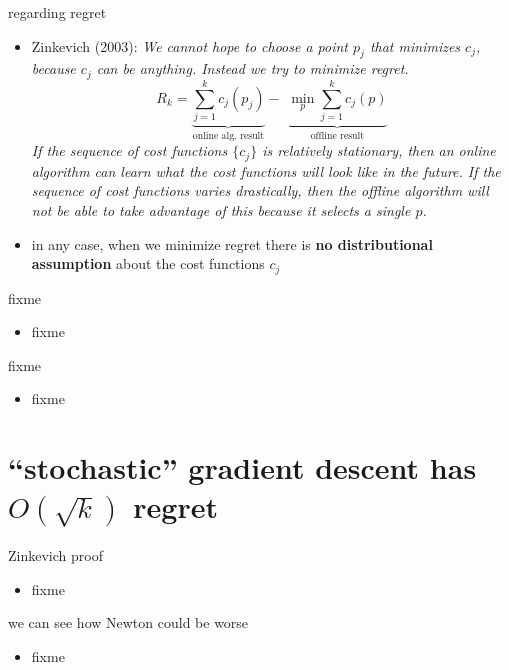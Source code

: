 \documentclass[xcolor={svgnames},
               hyperref={colorlinks,citecolor=DeepPink4,linkcolor=FireBrick,urlcolor=Maroon}]
               {beamer}
\begin{document}
\begin{frame}{regarding regret}

\begin{itemize}
\item Zinkevich (2003): \emph{We cannot hope to choose a point $p_j$ that minimizes $c_j$, because $c_j$ can be anything. Instead we try to minimize regret.}
  $$R_k = \underbrace{\sum_{j=1}^k c_j(p_j)}_{\text{online alg.~result}} - \,\, \underbrace{\min_p \sum_{j=1}^k c_j(p)}_{\text{offline result}}$$
\noindent \emph{If the sequence of cost functions $\{c_j\}$ is relatively stationary, then an online algorithm can learn what the cost functions will look like in the future.  If the sequence of cost functions varies drastically, then the offline algorithm will not be able to take advantage of this because it selects a single $p$.}

\item in any case, when we minimize regret there is \textbf{no distributional assumption} about the cost functions $c_j$
\end{itemize}
\end{frame}


\begin{frame}{fixme}

\begin{itemize}
\item fixme
\end{itemize}
\end{frame}

\begin{frame}{fixme}

\begin{itemize}
\item fixme
\end{itemize}
\end{frame}


\section{``stochastic'' gradient descent has $O(\sqrt{k})$ regret}

\begin{frame}{Zinkevich proof}

\begin{itemize}
\item fixme
\end{itemize}
\end{frame}

\begin{frame}{we can see how Newton could be worse}

\begin{itemize}
\item fixme
\end{itemize}
\end{frame}
\end{document}
